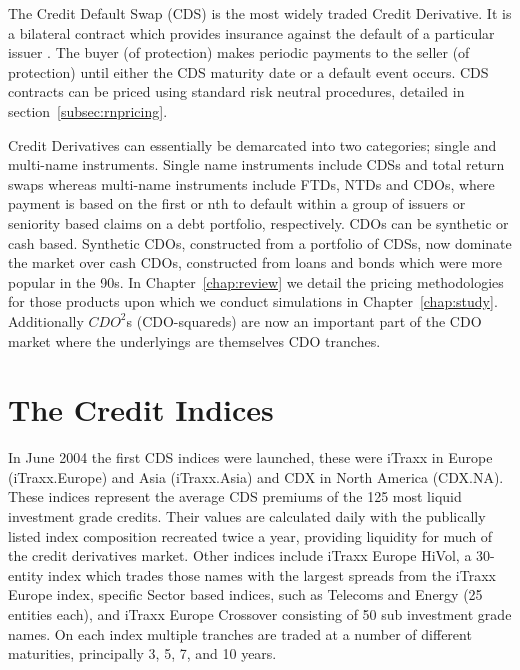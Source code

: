 The Credit Default Swap (CDS) is the most widely traded Credit Derivative. It is a bilateral contract which provides insurance against the default of a particular issuer \cite{Sch2003}. The buyer (of protection) makes periodic payments to the seller (of protection) until either the CDS maturity date or a default event occurs.  CDS contracts can be priced using standard risk neutral procedures, detailed in section~\ref{subsec:rnpricing}.

Credit Derivatives can essentially be demarcated into two categories; single and multi-name instruments. Single name instruments include CDSs and total return swaps whereas multi-name instruments include FTDs, NTDs and CDOs, where payment is based on the first or nth to default within a group of issuers or seniority based claims on a debt portfolio, respectively. CDOs can be synthetic or cash based. Synthetic CDOs, constructed from a portfolio of CDSs, now dominate the market over cash CDOs, constructed from loans and bonds which were more popular in the 90s. In Chapter~\ref{chap:review} we detail the pricing methodologies for those products upon which we conduct simulations in Chapter~\ref{chap:study}.  Additionally $CDO^2$s (CDO-squareds) are now an important part of the CDO market where the underlyings are themselves CDO tranches.


\section{The Credit Indices}

In June 2004 the first CDS indices were launched, these were iTraxx
in Europe (iTraxx.Europe) and Asia (iTraxx.Asia) and CDX in North America (CDX.NA). These indices represent the
average CDS premiums of the 125 most liquid investment grade credits.
Their values are calculated daily with the publically listed 
index composition recreated twice a year, providing liquidity for much of the credit derivatives market. Other indices include iTraxx Europe HiVol, a 30-entity index which trades those names with the largest spreads from the iTraxx Europe index, specific Sector based indices, such as Telecoms and Energy (25 entities each), and iTraxx Europe Crossover consisting of 50 sub investment grade names.  On each index multiple tranches are traded at a number of different maturities, principally 3, 5, 7, and 10 years.

